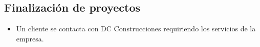 \subsection{Finalización de proyectos}
\begin{itemize}
    \item Un cliente se contacta con DC Construcciones requiriendo los servicios de la empresa.
\end{itemize}
